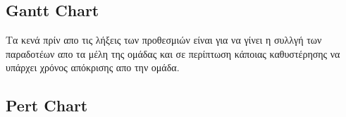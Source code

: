 \documentclass{article}
\begin{document}
\subsection{Gantt Chart}
Τα κενά πρίν απο τις λήξεις των προθεσμιών είναι για να γίνει η συλλγή των παραδοτέων απο τα μέλη της ομάδας και σε περίπτωση κάποιας καθυστέρησης να υπάρχει χρόνος απόκρισης απο την ομάδα.
\begin{center}
\end{center}

\subsection{Pert Chart}
\end{document}
